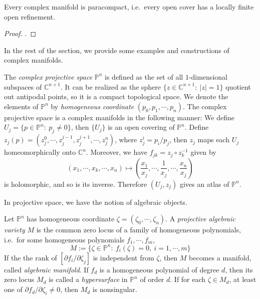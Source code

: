 \begin{lem}
    Every complex manifold is paracompact, i.e.\ every open cover has a locally finite open refinement.
\end{lem}
\begin{proof}
    \cite[Theorem~4.77]{LeeTop}.
\end{proof}

In the rest of the section, we provide some examples and constructions of complex manifolds.

\begin{cons}
    The \emph{complex projective space} $\mathbb{P}^n$ is defined as the set of all $1$-dimensional subspaces of $\mathbb{C}^{n+1}$.
    It can be realized as the sphere $\{z\in\mathbb{C}^{n+1}:\ |z|=1\}$ quotient out antipodal points, so it is a compact topological space.
    We denote the elements of $\mathbb{P}^n$ by \emph{homogeneous coordinate} $(p_0,p_1,\cdots,p_n)$.
    The complex projective space is a complex manifolds in the following manner:
    We define $U_j=\{p\in\mathbb{P}^n:\ p_j\neq 0\}$, then $\{U_j\}$ is an open covering of $\mathbb{P}^n$.
    Define $z_j(p)=(z_j^0,\cdots,z_j^{j-1},z_j^{j+1},\cdots,z_j^n)$, where $z_j^i=p_i/p_j$, then $z_j$ maps each $U_j$ homeomorphically onto $\mathbb{C}^n$.
    Moreover, we have $f_{jk}=z_j\circ z_k^{-1}$ given by
    \[(x_1,\cdots,x_k,\cdots,x_n)\mapsto\left(\frac{x_1}{x_j},\cdots,\frac{1}{x_j},\cdots,\frac{x_n}{x_j}\right)\]
    is holomorphic, and so is its inverse.
    Therefore $(U_j,z_j)$ gives an atlas of $\mathbb{P}^n$.
\end{cons}

In projective space, we have the notion of algebraic objects.

\begin{defn}
    Let $\mathbb{P}^n$ has homogeneous coordinate $\zeta=(\zeta_0,\cdots,\zeta_n)$.
    A \emph{projective algebraic variety} $M$ is the common zero locus of a family of homogeneous polynomials, i.e.\ for some homogeneous polynomials $f_1,\cdots,f_m$, 
    \[M:=\{\zeta\in\mathbb{P}^n:\ f_i(\zeta)=0,\ i=1,\cdots,m\}\]
    If the the rank of $[\partial{f_i}/\partial{\zeta_j}]$ is independent from $\zeta$, then $M$ becomes a manifold, called \emph{algebraic manifold}.
    If $f_d$ is a homogeneous polynomial of degree $d$, then its zero locus $M_d$ is called a \emph{hypersurface} in $\mathbb{P}^n$ of order $d$.
    If for each $\zeta\in M_d$, at least one of $\partial f_d/\partial\zeta_i\neq 0$, then $M_d$ is nonsingular.
\end{defn}

